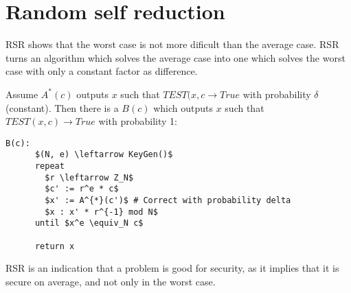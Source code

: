 \documentclass[a4paper]{scrreprt}
\begin{document}
\section{Random self reduction}

RSR shows that the worst case is not more dificult than the average case. RSR
turns an algorithm which solves the average case into one which solves the
worst case with only a constant factor as difference.

Assume $A^{*}(c)$ outputs $x$ such that $TEST(x, c \rightarrow True$ with
probability $\delta$ (constant). Then there is a $B(c)$ which outputs $x$ such
that $TEST(x, c) \rightarrow True$ with probability 1:

\begin{lstlisting}[mathescape=true,autogobble=true]
	B(c):
	  $(N, e) \leftarrow KeyGen()$
	  repeat
	    $r \leftarrow Z_N$
	    $c' := r^e * c$
	    $x' := A^{*}(c')$ # Correct with probability delta
	    $x : x' * r^{-1} mod N$
	  until $x^e \equiv_N c$

	  return x
\end{lstlisting}

RSR is an indication that a problem is good for security, as it implies that it
is secure on average, and not only in the worst case.
\end{document}
